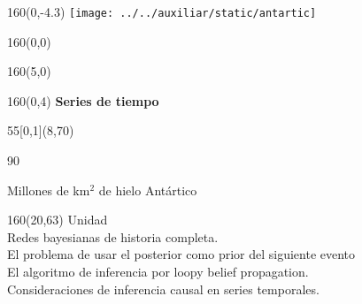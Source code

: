 \documentclass[shownotes,aspectratio=169]{beamer}
\newcounter{capitulo}
\newcommand{\unidad}{\thecapitulo \stepcounter{capitulo}}
\begin{document}
\begin{frame}
\begin{textblock}{160}(0,-4.3) \centering
\texttt{[image: ../../auxiliar/static/antartic]}
\end{textblock}

\begin{textblock}{160}(0,0) \centering
{}
\end{textblock}

\begin{textblock}{160}(5,0)
\end{textblock}


\begin{textblock}{160}(0,4) \centering
\LARGE \hspace{1cm} \textcolor{black!20}{\fontsize{22}{0}\selectfont \textbf{Series de tiempo}}
\end{textblock}


\begin{textblock}{55}[0,1](8,70)
\begin{turn}{90}
\parbox{6cm}{\footnotesize
\textcolor{black!10}{Millones de km$^2$ de hielo Antártico}}
\end{turn}
\end{textblock}


\begin{textblock}{160}(20,63)
\textcolor{black!10}{Unidad \unidad \\ \small
Redes bayesianas de historia completa. \\
El problema de usar el posterior como prior del siguiente evento\\
El algoritmo de inferencia por loopy belief propagation. \\
Consideraciones de inferencia causal en series temporales. \\
}
\end{textblock}


\end{frame}
%
\end{document}
